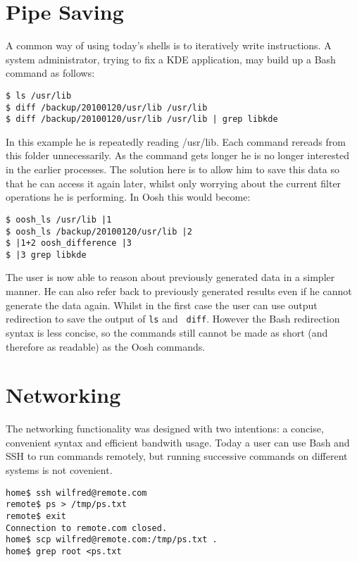 \documentclass[12pt,twoside,notitlepage]{report}
\begin{document}
\section{Pipe Saving}
A common way of using today's shells is to iteratively write instructions. A
system administrator, trying to fix a KDE application, may build up a Bash command as
follows:
\begin{verbatim}
$ ls /usr/lib
$ diff /backup/20100120/usr/lib /usr/lib
$ diff /backup/20100120/usr/lib /usr/lib | grep libkde
\end{verbatim}

In this example he is repeatedly reading /usr/lib. Each command rereads from
this folder unnecessarily. As the command gets longer he is no longer interested in
the earlier processes. The solution here is to allow him to save this data so
that he can access it again later, whilst only worrying about the current filter
operations he is performing. In Oosh this would become:

\begin{verbatim}
$ oosh_ls /usr/lib |1
$ oosh_ls /backup/20100120/usr/lib |2
$ |1+2 oosh_difference |3
$ |3 grep libkde
\end{verbatim}

The user is now able to reason about previously generated data in a simpler
manner. He can also refer back to previously generated results even if he cannot
generate the data again. Whilst in the first case %
the user can use output redirection to save the output of {\tt ls} and {\tt
  diff}. However the Bash redirection syntax is less concise, so the commands
still cannot be made as short (and therefore as readable) %
as the Oosh commands.

\section{Networking}

The networking functionality was designed with two intentions: a concise,
convenient syntax and efficient bandwith usage. Today a user can use Bash and
SSH to run commands remotely, but running successive commands on different
systems is not covenient.

\begin{verbatim}
home$ ssh wilfred@remote.com
remote$ ps > /tmp/ps.txt
remote$ exit
Connection to remote.com closed.
home$ scp wilfred@remote.com:/tmp/ps.txt .
home$ grep root <ps.txt 
\end{verbatim}
\end{document}
